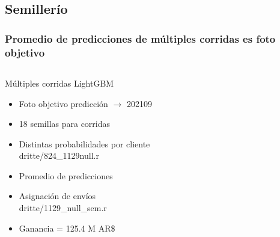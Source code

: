 \documentclass[aspectratio=169]{beamer} %
\begin{document}
\subsection{Semillerío}

\begin{frame}
  \frametitle{Promedio de predicciones de múltiples corridas es foto objetivo}
  \begin{columns}[onlytextwidth]
    \begin{column}{.6\textwidth}
      \begin{block}{Múltiples corridas LightGBM}
        \begin{itemize}
          \item Foto objetivo predicción $\rightarrow$ 202109
          \item 18 semillas para corridas
          \item Distintas probabilidades por cliente\\
          {\tiny dritte/824\_1129null.r}
          \item Promedio de predicciones\\
          \item Asignación de envíos\\
          {\tiny dritte/1129\_null\_sem.r}
			    \item Ganancia = 125.4 M AR\$
        \end{itemize}
      \end{block}
    \end{column}
  \end{columns}      
\end{frame}
\end{document}
